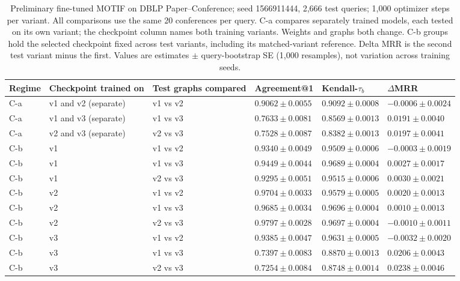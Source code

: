 \begin{table}[htbp]
\centering
\small
\renewcommand{\arraystretch}{1.15}
\setlength{\tabcolsep}{5pt}
\begin{adjustbox}{max width=\linewidth}
\begin{tabular}{|l|l|l|l|l|l|}
\hline
\textbf{Regime} & \textbf{Checkpoint trained on} & \textbf{Test graphs compared} & \textbf{Agreement@1} & \textbf{Kendall-$\tau_b$} & \textbf{$\Delta$MRR} \\
\hline
C-a & v1 and v2 (separate) & v1 vs v2 & $0.9062 \pm 0.0055$ & $0.9092 \pm 0.0008$ & $-0.0006 \pm 0.0024$ \\
\hline
C-a & v1 and v3 (separate) & v1 vs v3 & $0.7633 \pm 0.0081$ & $0.8569 \pm 0.0013$ & $0.0191 \pm 0.0040$ \\
\hline
C-a & v2 and v3 (separate) & v2 vs v3 & $0.7528 \pm 0.0087$ & $0.8382 \pm 0.0013$ & $0.0197 \pm 0.0041$ \\
\hline
C-b & v1 & v1 vs v2 & $0.9340 \pm 0.0049$ & $0.9509 \pm 0.0006$ & $-0.0003 \pm 0.0019$ \\
\hline
C-b & v1 & v1 vs v3 & $0.9449 \pm 0.0044$ & $0.9689 \pm 0.0004$ & $0.0027 \pm 0.0017$ \\
\hline
C-b & v1 & v2 vs v3 & $0.9295 \pm 0.0051$ & $0.9515 \pm 0.0006$ & $0.0030 \pm 0.0021$ \\
\hline
C-b & v2 & v1 vs v2 & $0.9704 \pm 0.0033$ & $0.9579 \pm 0.0005$ & $0.0020 \pm 0.0013$ \\
\hline
C-b & v2 & v1 vs v3 & $0.9685 \pm 0.0034$ & $0.9696 \pm 0.0004$ & $0.0010 \pm 0.0013$ \\
\hline
C-b & v2 & v2 vs v3 & $0.9797 \pm 0.0028$ & $0.9697 \pm 0.0004$ & $-0.0010 \pm 0.0011$ \\
\hline
C-b & v3 & v1 vs v2 & $0.9385 \pm 0.0047$ & $0.9631 \pm 0.0005$ & $-0.0032 \pm 0.0020$ \\
\hline
C-b & v3 & v1 vs v3 & $0.7397 \pm 0.0083$ & $0.8870 \pm 0.0013$ & $0.0206 \pm 0.0043$ \\
\hline
C-b & v3 & v2 vs v3 & $0.7254 \pm 0.0084$ & $0.8748 \pm 0.0014$ & $0.0238 \pm 0.0046$ \\
\hline
\end{tabular}
\end{adjustbox}
\caption{Preliminary fine-tuned MOTIF on DBLP Paper--Conference; seed 1566911444, 2,666 test queries; 1,000 optimizer steps per variant. All comparisons use the same 20 conferences per query. C-a compares separately trained models, each tested on its own variant; the checkpoint column names both training variants. Weights and graphs both change. C-b groups hold the selected checkpoint fixed across test variants, including its matched-variant reference. Delta MRR is the second test variant minus the first. Values are estimates $\pm$ query-bootstrap SE (1,000 resamples), not variation across training seeds.}
\label{tab:motif-dblp-matrix-invariance}
\end{table}
